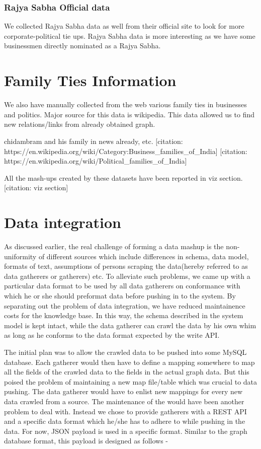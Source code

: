 \subsubsection{Rajya Sabha Official data}

We collected Rajya Sabha data as well from their official site to look for more corporate-political tie ups. Rajya Sabha data is more interesting as we have some businessmen directly nominated as a Rajya Sabha.  

\section{Family Ties Information}

We also have manually collected from the web various family ties in businesses and politics. Major source for this data is wikipedia. This data allowed us to find new relations/links from already obtained graph.

chidambram and his family in news already, etc.
[citation: https://en.wikipedia.org/wiki/Category:Business\_families\_of\_India]
[citation: https://en.wikipedia.org/wiki/Political\_families\_of\_India]

All the mash-ups created by these datasets have been reported in viz section. [citation: viz section]

\section{Data integration}

As discussed earlier, the real challenge of forming a data mashup is the non-uniformity of different sources which include differences in schema, data model, formats of text, assumptions of persons scraping the data(hereby referred to as data gatherers or gatherers) etc. To alleviate such problems, we came up with a particular data format to be used by all data gatherers on conformance with which he or she should preformat data before pushing in to the system. By separating out the problem of data integration, we have reduced maintainence costs for the knowledge base. In this way, the schema described in the system model is kept intact, while the data gatherer can crawl the data by his own whim as long as he conforms to the data format expected by the write API.

The initial plan was to allow the crawled data to be pushed into some MySQL database. Each gatherer would then have to define a mapping somewhere to map all the fields of the crawled data to the fields in the actual graph data. But this poised the problem of maintaining a new map file/table which was crucial to data pushing. The data gatherer would have to enlist new mappings for every new data crawled from a source. The maintenance of the  would have been another problem to deal with.
%
Instead we chose to provide gatherers with a REST API and  a specific data format which he/she has to adhere to while pushing in the data.
For now, JSON payload is used in a specific format. Similar to the graph database format, this payload is designed as follows -

